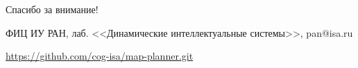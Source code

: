 \documentclass[default]{beamer}
\begin{document}
\begin{frame}
\begin{columns}
		\end{columns}
		\vspace{-5pt}
		\nocite{*}
		\printbibliography[keyword={strl}, resetnumbers=true]
	\end{frame}

	\begin{frame}
		\centering
		\Huge
		Спасибо за внимание!
		\normalsize
		\par\bigskip
		\par\bigskip
		ФИЦ ИУ РАН, лаб. <<Динамические интеллектуальные системы>>, pan@isa.ru
		\par\bigskip
		\par\bigskip
		\url{https://github.com/cog-isa/map-planner.git}
	\end{frame}
	
\end{document}

